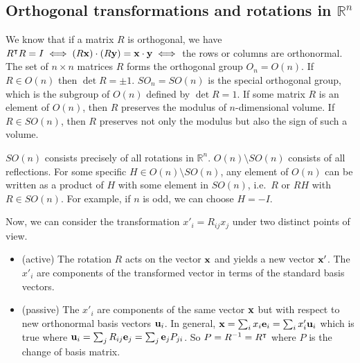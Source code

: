 \subsection{Orthogonal transformations and rotations in \(\mathbb R^n\)}
We know that if a matrix \(R\) is orthogonal, we have \(R^\intercal R = I \iff (R\vb x) \cdot (R\vb y) = \vb x \cdot \vb y \iff\) the rows or columns are orthonormal.
The set of \(n \times n\) matrices \(R\) forms the orthogonal group \(O_n = O(n)\).
If \(R \in O(n)\) then \(\det R = \pm 1\).
\(SO_n = SO(n)\) is the special orthogonal group, which is the subgroup of \(O(n)\) defined by \(\det R = 1\).
If some matrix \(R\) is an element of \(O(n)\), then \(R\) preserves the modulus of \(n\)-dimensional volume.
If \(R \in SO(n)\), then \(R\) preserves not only the modulus but also the sign of such a volume.

\(SO(n)\) consists precisely of all rotations in \(\mathbb R^n\).
\(O(n) \setminus SO(n)\) consists of all reflections.
For some specific \(H \in O(n) \setminus SO(n)\), any element of \(O(n)\) can be written as a product of \(H\) with some element in \(SO(n)\), i.e.\ \(R\) or \(RH\) with \(R \in SO(n)\).
For example, if \(n\) is odd, we can choose \(H = -I\).

Now, we can consider the transformation \(x'_i = R_{ij} x_j\) under two distinct points of view.
\begin{itemize}
	\item (active) The rotation \(R\) acts on the vector \(\vb x\) and yields a new vector \(\vb x'\).
	      The \(x'_i\) are components of the transformed vector in terms of the standard basis vectors.
	\item (passive) The \(x'_i\) are components of the same vector \(\vb x\) but with respect to new orthonormal basis vectors \(\vb u_i\).
	      In general, \(\vb x = \sum_i x_i \vb e_i = \sum_i x'_i \vb u_i\) which is true where \(\vb u_i = \sum_j R_{ij} \vb e_j = \sum_j \vb e_j P_{ji}\).
	      So \(P = R^{-1} = R^\intercal\) where \(P\) is the change of basis matrix.
\end{itemize}

